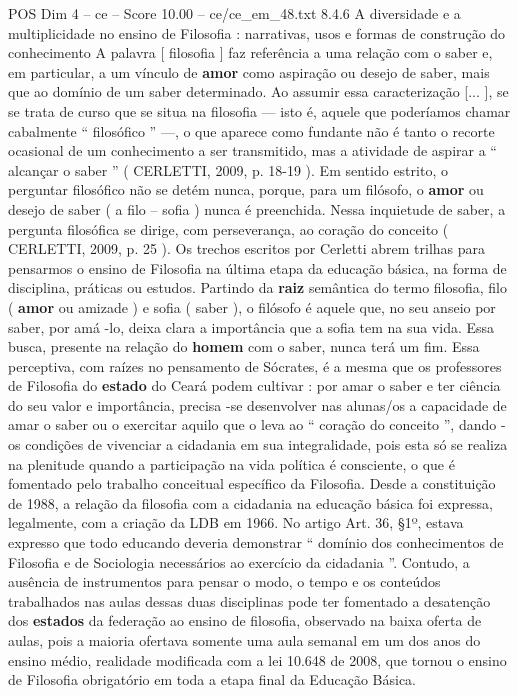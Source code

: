 \begin{textsample}{POS Dim 4 – ce – Score 10.00 – ce/ce\_em\_48.txt}  \label{ex:f4_pos_135}
8.4.6 A diversidade e a multiplicidade no ensino de Filosofia : narrativas, usos e formas de construção do conhecimento A palavra [ filosofia ] faz referência a uma relação com o saber e, em particular, a um vínculo de \textbf{amor} como aspiração ou desejo de saber, mais que ao domínio de um saber determinado.
Ao assumir essa caracterização [... ], se se trata de curso que se situa na filosofia — isto é, aquele que poderíamos chamar cabalmente “ filosófico ” —, o que aparece como fundante não é tanto o recorte ocasional de um conhecimento a ser transmitido, mas a atividade de aspirar a “ alcançar o saber ” ( CERLETTI, 2009, p. 18-19 ).
Em sentido estrito, o perguntar filosófico não se detém nunca, porque, para um filósofo, o \textbf{amor} ou desejo de saber ( a filo – sofia ) nunca é preenchida.
Nessa inquietude de saber, a pergunta filosófica se dirige, com perseverança, ao coração do conceito ( CERLETTI, 2009, p. 25 ).
Os trechos escritos por Cerletti abrem trilhas para pensarmos o ensino de Filosofia na última etapa da educação básica, na forma de disciplina, práticas ou estudos.
Partindo da \textbf{raiz} semântica do termo filosofia, filo ( \textbf{amor} ou amizade ) e sofia ( saber ), o filósofo é aquele que, no seu anseio por saber, por amá -lo, deixa clara a importância que a sofia tem na sua vida.
Essa busca, presente na relação do \textbf{homem} com o saber, nunca terá um fim.
Essa perceptiva, com raízes no pensamento de Sócrates, é a mesma que os professores de Filosofia do \textbf{estado} do Ceará podem cultivar : por amar o saber e ter ciência do seu valor e importância, precisa -se desenvolver nas alunas/os a capacidade de amar o saber ou o exercitar aquilo que o leva ao “ coração do conceito ”, dando -os condições de vivenciar a cidadania em sua integralidade, pois esta só se realiza na plenitude quando a participação na vida política é consciente, o que é fomentado pelo trabalho conceitual específico da Filosofia.
Desde a constituição de 1988, a relação da filosofia com a cidadania na educação básica foi expressa, legalmente, com a criação da LDB em 1966.
No artigo Art. 36, §1º, estava expresso que todo educando deveria demonstrar “ domínio dos conhecimentos de Filosofia e de Sociologia necessários ao exercício da cidadania ”.
Contudo, a ausência de instrumentos para pensar o modo, o tempo e os conteúdos trabalhados nas aulas dessas duas disciplinas pode ter fomentado a desatenção dos \textbf{estados} da federação ao ensino de filosofia, observado na baixa oferta de aulas, pois a maioria ofertava somente uma aula semanal em um dos anos do ensino médio, realidade modificada com a lei 10.648 de 2008, que tornou o ensino de Filosofia obrigatório em toda a etapa final da Educação Básica.

\end{textsample}
